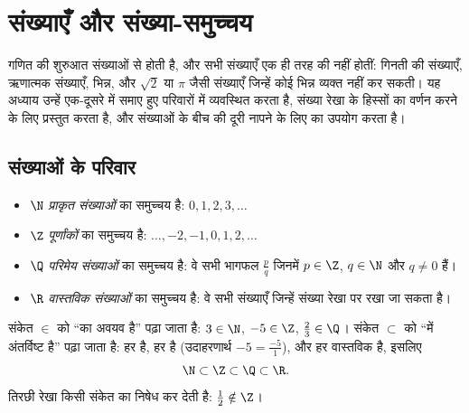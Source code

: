 \chapter{संख्याएँ और संख्या-समुच्चय}\label{ch:g10:numbers}

गणित की शुरुआत संख्याओं से होती है, और सभी संख्याएँ एक ही तरह की नहीं होतीं:
गिनती की संख्याएँ, ऋणात्मक संख्याएँ, भिन्न, और $\sqrt 2$ या $\pi$ जैसी संख्याएँ
जिन्हें कोई भिन्न व्यक्त नहीं कर सकती। यह अध्याय उन्हें एक-दूसरे में समाए हुए
परिवारों में व्यवस्थित करता है, संख्या रेखा के हिस्सों का वर्णन करने के लिए
 प्रस्तुत करता है, और संख्याओं के बीच की दूरी नापने के लिए 
का उपयोग करता है।

\section{संख्याओं के परिवार}

\begin{definition}[संख्या-समुच्चय]\label{def:g10:numbers:sets}
\begin{itemize}
  \item $\N$ \emph{प्राकृत संख्याओं} का समुच्चय है:
        $0, 1, 2, 3, \dots$
  \item $\Z$ \emph{पूर्णांकों} का समुच्चय है: $\dots, -2, -1,
        0, 1, 2, \dots$
  \item $\Q$ \emph{परिमेय संख्याओं} का समुच्चय है:
        वे सभी भागफल $\frac{p}{q}$ जिनमें $p \in \Z$, $q \in \N$ और
        $q \neq 0$ हैं।
  \item $\R$ \emph{वास्तविक संख्याओं} का समुच्चय है:
        वे सभी संख्याएँ जिन्हें संख्या रेखा पर रखा जा सकता है।
\end{itemize}
\end{definition}

\begin{notation}
संकेत $\in$ को ``का अवयव है'' पढ़ा जाता है: $3 \in \N$, $-5 \in \Z$,
$\frac23 \in \Q$। संकेत $\subset$ को ``में अंतर्विष्ट है'' पढ़ा जाता है: हर 
 है, हर   है
(उदाहरणार्थ $-5 = \frac{-5}{1}$), और हर  वास्तविक है, इसलिए
\[
\N \subset \Z \subset \Q \subset \R .
\]
तिरछी रेखा किसी संकेत का निषेध कर देती है: $\frac12 \notin \Z$।
\end{notation}

